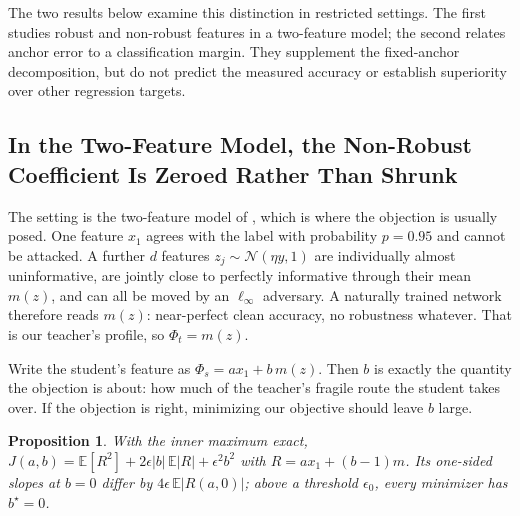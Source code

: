 \documentclass{article} %
\theoremstyle{plain}
\newtheorem{proposition}{Proposition}
\begin{document}
The two results below examine this distinction in restricted settings. The first studies robust
and non-robust features in a two-feature model; the second relates anchor error to a classification
margin. They supplement the fixed-anchor decomposition, but do not predict the measured accuracy
or establish superiority over other regression targets.

\subsection{In the Two-Feature Model, the Non-Robust Coefficient Is Zeroed Rather Than Shrunk}

The setting is the two-feature model of \citet{tsipras2018robustness}, which is where the objection is
usually posed. One feature $x_1$ agrees with the label with probability $p = 0.95$ and cannot be
attacked. A further $d$ features $z_j \sim \mathcal{N}(\eta y, 1)$ are individually almost
uninformative, are jointly close to perfectly informative through their mean $m(z)$, and can all be
moved by an $\ell_\infty$ adversary. A naturally trained network therefore reads $m(z)$: near-perfect
clean accuracy, no robustness whatever. That is our teacher's profile, so $\Phi_t = m(z)$.

Write the student's feature as $\Phi_s = a x_1 + b\, m(z)$. Then $b$ is exactly the quantity the
objection is about: how much of the teacher's fragile route the student takes over. If the objection
is right, minimizing our objective should leave $b$ large.

\begin{proposition}
\label{prop:l1}
With the inner maximum exact,
$J(a,b) = \mathbb{E}[R^2] + 2\epsilon\lvert b\rvert\,\mathbb{E}\lvert R\rvert + \epsilon^2 b^2$ with
$R = a x_1 + (b-1)m$. Its one-sided slopes at $b=0$ differ by
$4\epsilon\,\mathbb{E}\lvert R(a,0)\rvert$; above a threshold $\epsilon_0$, every minimizer has
$b^\star = 0$.
\end{proposition}
\end{document}
